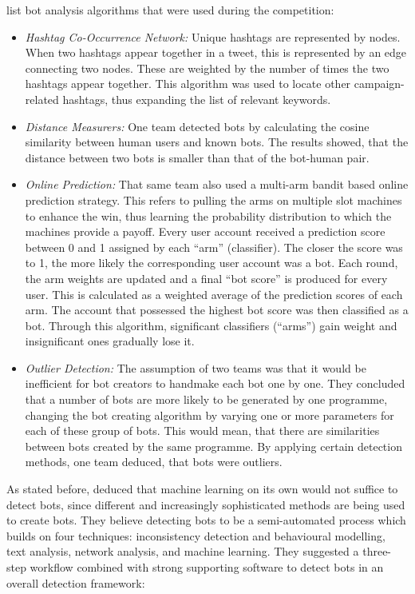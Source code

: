     \textcite[43]{theDarpaTwitterBotChallenge} list bot analysis algorithms that were used during the competition:
    \begin{itemize}
        \item \textit{Hashtag Co-Occurrence Network:} Unique hashtags are represented by nodes. When two hashtags appear together in a tweet, this is represented by an edge connecting two nodes. These are weighted by the number of times the two hashtags appear together. This algorithm was used to locate other campaign-related hashtags, thus expanding the list of relevant keywords.
        \item \textit{Distance Measurers:} One team detected bots by calculating the cosine similarity between human users and known bots. The results showed, that the distance between two bots is smaller than that of the bot-human pair.
        \item \textit{Online Prediction:} That same team also used a multi-arm bandit based online prediction strategy. This refers to pulling the arms on multiple slot machines to enhance the win, thus learning the probability distribution to which the machines provide a payoff. Every user account received a prediction score between 0 and 1 assigned by each “arm” (classifier). The closer the score was to 1, the more likely the corresponding user account was a bot. Each round, the arm weights are updated and a final “bot score” is produced for every user. This is calculated as a weighted average of the prediction scores of each arm. The account that possessed the highest bot score was then classified as a bot. Through this algorithm, significant classifiers (“arms”) gain weight and insignificant ones gradually lose it.
        \item \textit{Outlier Detection:} The assumption of two teams was that it would be inefficient for bot creators to handmake each bot one by one. They concluded that a number of bots are more likely to be generated by one programme, changing the bot creating algorithm by varying one or more parameters for each of these group of bots. This would mean, that there are similarities between bots created by the same programme. By applying certain detection methods, one team deduced, that bots were outliers.
    \end{itemize}
    
        As stated before, \textcite[40, 44]{theDarpaTwitterBotChallenge} deduced that machine learning on its own would not suffice to detect bots, since different and increasingly sophisticated methods are being used to create bots. They believe detecting bots to be a semi-automated process which builds on four techniques: inconsistency detection and behavioural modelling, text analysis, network analysis, and machine learning. They suggested a three-step workflow combined with strong supporting software to detect bots in an overall detection framework:
        
